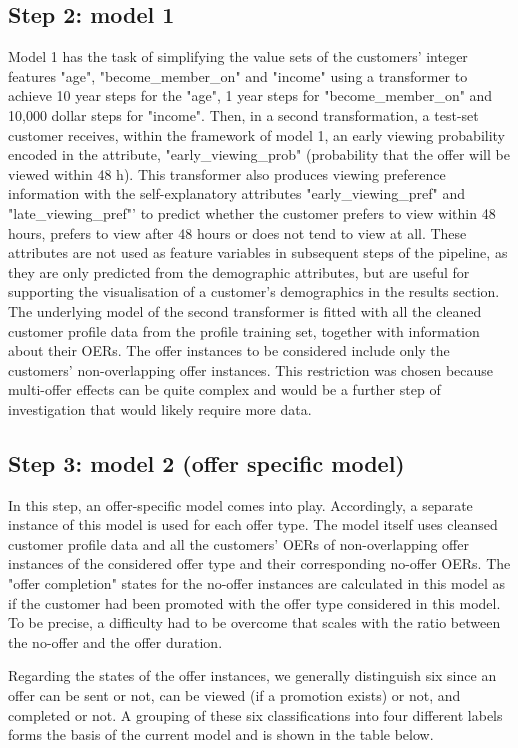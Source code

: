 \documentclass[11pt]{article} %
\begin{document}
\subsection{Step 2: model 1}
Model 1 has the task of simplifying the value sets of the customers' integer features "age", "become\_member\_on" and "income" using a transformer to achieve 10 year steps for the "age", 1 year steps for "become\_member\_on" and 10,000 dollar steps for "income".
Then, in a second transformation, a test-set customer receives, within the framework of model 1, an early viewing probability encoded in the attribute, "early\_viewing\_prob" (probability that the offer will be viewed within 48 h).
This transformer also produces viewing preference information with the self-explanatory attributes "early\_viewing\_pref" and "late\_viewing\_pref"' to predict whether the customer prefers to view within 48 hours, prefers to view after 48 hours or does not tend to view at all.
These attributes are not used as feature variables in subsequent steps of the pipeline, as they are only predicted from the demographic attributes, but are useful for supporting the visualisation of a customer's demographics in the results section.
The underlying model of the second transformer is fitted with all the cleaned customer profile data from the profile training set, together with information about their OERs. The offer instances to be considered include only the customers' non-overlapping offer instances. This restriction was chosen because multi-offer effects can be quite complex and would be a further step of investigation that would likely require more data.


\subsection{Step 3: model 2 (offer specific model)}

In this step, an offer-specific model comes into play. Accordingly, a separate instance of this model is used for each offer type.
The model itself uses cleansed customer profile data and all the customers' OERs of non-overlapping offer instances of the considered offer type and their corresponding no-offer OERs.
The "offer completion" states for the no-offer instances are calculated in this model as if the customer had been promoted with the offer type considered in this model.
To be precise, a difficulty had to be overcome that scales with the ratio between the no-offer and the offer duration.

Regarding the states of the offer instances, we generally distinguish six since an offer can be  sent or not, can be viewed (if a promotion exists) or not, and completed or not.
A grouping of these six classifications into four different labels forms the basis of the current model and is shown in the table below.
\end{document}
